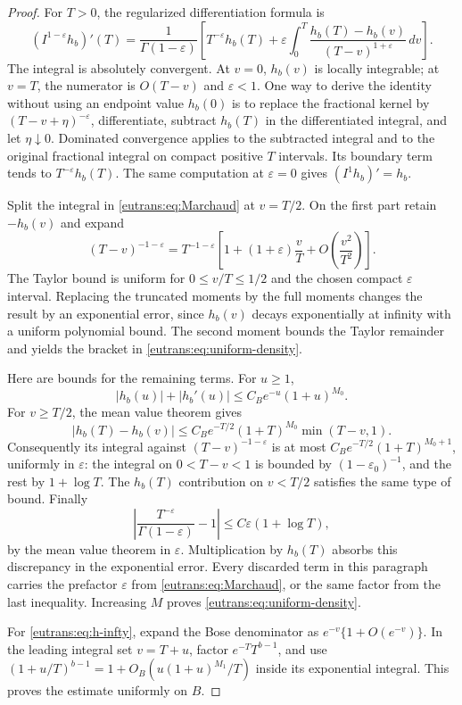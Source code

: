 \documentclass[11pt,a4paper]{article}
\numberwithin{equation}{section}
\theoremstyle{definition}
\theoremstyle{remark}
\begin{document}
\begin{proof}
For $T>0$, the regularized differentiation formula is
\begin{equation}\label{eutrans:eq:Marchaud}
 (I^{1-\varepsilon}h_b)'(T)
 =\frac1{\Gamma(1-\varepsilon)}\left[
 T^{-\varepsilon}h_b(T)
 +\varepsilon\int_0^T
       \frac{h_b(T)-h_b(v)}{(T-v)^{1+\varepsilon}}\,dv\right].
\end{equation}
The integral is absolutely convergent. At $v=0$, $h_b(v)$ is
locally integrable; at $v=T$, the numerator is $O(T-v)$ and
$\varepsilon<1$. One way to derive the identity without using an
endpoint value $h_b(0)$ is to replace the fractional kernel by
$(T-v+\eta)^{-\varepsilon}$, differentiate, subtract $h_b(T)$ in
the differentiated integral, and let $\eta\downarrow0$. Dominated
convergence applies to the subtracted integral and to the original
fractional integral on compact positive $T$ intervals. Its boundary
term tends to $T^{-\varepsilon}h_b(T)$. The same computation at
$\varepsilon=0$ gives $(I^1h_b)'=h_b$.

Split the integral in \eqref{eutrans:eq:Marchaud} at $v=T/2$.
On the first part retain $-h_b(v)$ and expand
\[
 (T-v)^{-1-\varepsilon}=T^{-1-\varepsilon}
 \left[1+(1+\varepsilon)\frac vT
                  +O\left(\frac{v^2}{T^2}\right)\right].
\]
The Taylor bound is uniform for $0\leq v/T\leq1/2$ and the chosen
compact $\varepsilon$ interval. Replacing the truncated moments by
the full moments changes the result by an exponential error, since
$h_b(v)$ decays exponentially at infinity with a uniform polynomial
bound. The second moment bounds the Taylor remainder and yields
the bracket in \eqref{eutrans:eq:uniform-density}.

Here are bounds for the remaining terms. For $u\geq1$,
\[
 |h_b(u)|+|h_b'(u)|
       \leq C_B e^{-u}(1+u)^{M_0}.
\]
For $v\geq T/2$, the mean value theorem gives
\[
 |h_b(T)-h_b(v)|
 \leq C_B e^{-T/2}(1+T)^{M_0}\min(T-v,1).
\]
Consequently its integral against $(T-v)^{-1-\varepsilon}$ is at
most $C_Be^{-T/2}(1+T)^{M_0+1}$, uniformly in $\varepsilon$:
the integral on $0<T-v<1$ is bounded by $(1-\varepsilon_0)^{-1}$,
and the rest by $1+\log T$.
The $h_b(T)$ contribution on $v<T/2$ satisfies the same type of
bound. Finally
\[
 \left|\frac{T^{-\varepsilon}}{\Gamma(1-\varepsilon)}-1\right|
                \leq C\varepsilon(1+\log T),
\]
by the mean value theorem in $\varepsilon$. Multiplication by
$h_b(T)$ absorbs this discrepancy in the exponential error. Every
discarded term in this paragraph carries the prefactor
$\varepsilon$ from \eqref{eutrans:eq:Marchaud}, or the same factor
from the last inequality. Increasing $M$ proves
\eqref{eutrans:eq:uniform-density}.

For \eqref{eutrans:eq:h-infty}, expand the Bose denominator as
$e^{-v}\{1+O(e^{-v})\}$. In the leading integral set $v=T+u$,
factor $e^{-T}T^{b-1}$, and use
$(1+u/T)^{b-1}=1+O_B(u(1+u)^{M_1}/T)$ inside its exponential
integral. This proves the estimate uniformly on $B$.
\end{proof}
\end{document}
